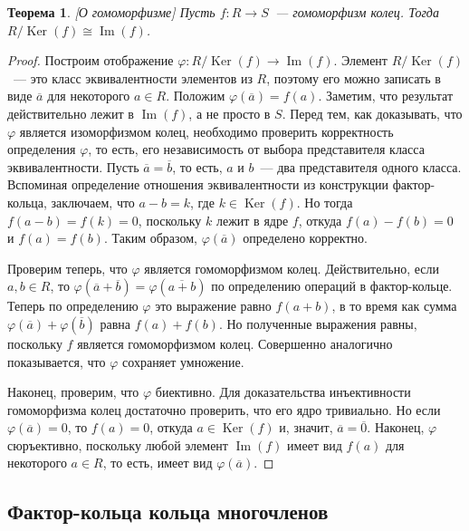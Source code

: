 \documentclass[a4paper,11pt]{scrartcl}
\theoremstyle{plain}
\newtheorem{theorem}{Теорема}[subsection]
\theoremstyle{definition}
\newcommand\isom{\cong}
\newcommand\ph{\varphi}
\newcommand{\Img}{\operatorname{Im}}
\newcommand\Ker{\operatorname{Ker}}
\begin{document}
\begin{theorem}\label{theorem_homo}[О гомоморфизме]
Пусть $f\colon R\to S$~--- гомоморфизм колец. Тогда
$R/\Ker(f)\isom\Img(f)$.
\end{theorem}
\begin{proof}
Построим отображение $\ph\colon R/\Ker(f)\to\Img(f)$. Элемент
$R/\Ker(f)$~--- это класс эквивалентности элементов из $R$, поэтому
его можно записать в виде $\overline{a}$ для некоторого $a\in
R$. Положим $\ph(\overline{a})=f(a)$. Заметим, что результат
действительно лежит в $\Img(f)$, а не просто в $S$.
Перед тем, как доказывать, что
$\ph$ является изоморфизмом колец, необходимо проверить корректность
определения $\ph$, то есть, его независимость от выбора представителя
класса эквивалентности. Пусть $\overline{a}=\overline{b}$, то есть,
$a$ и $b$~--- два представителя одного класса. Вспоминая определение
отношения эквивалентности из конструкции фактор-кольца, заключаем, что
$a-b=k$, где $k\in\Ker(f)$. Но тогда $f(a-b)=f(k)=0$, поскольку $k$
лежит в ядре $f$, откуда $f(a)-f(b)=0$ и $f(a)=f(b)$. Таким образом,
$\ph(\overline{a})$ определено корректно.

Проверим теперь, что $\ph$ является гомоморфизмом
колец. Действительно, если $a,b\in R$, то
$\ph(\overline{a}+\overline{b})=\ph(\overline{a+b})$ по определению
операций в фактор-кольце. Теперь по определению $\ph$ это выражение
равно $f(a+b)$, в то время как сумма
$\ph(\overline{a})+\ph(\overline{b})$ равна $f(a)+f(b)$. Но полученные
выражения равны, поскольку $f$ является гомоморфизмом
колец. Совершенно аналогично показывается, что $\ph$ сохраняет
умножение.

Наконец, проверим, что $\ph$ биективно. Для доказательства
инъективности гомоморфизма колец достаточно проверить, что его ядро
тривиально. Но если $\ph(\overline{a})=0$, то $f(a)=0$, откуда
$a\in\Ker(f)$ и, значит, $\overline{a}=\overline{0}$. Наконец, $\ph$
сюръективно, поскольку любой элемент $\Img(f)$ имеет вид $f(a)$ для
некоторого $a\in R$, то есть, имеет вид $\ph(\overline{a})$.
\end{proof} 

\subsection{Фактор-кольца кольца многочленов}
\end{document}

